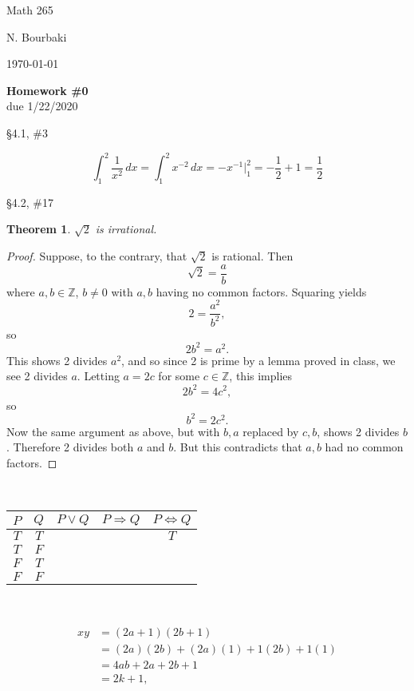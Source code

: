 \documentclass[11pt]{report}
\theoremstyle{plain}
\newtheorem{thm}{Theorem}
\begin{document}
\hfill Math 265

\hfill N. Bourbaki

\hfill \today

\begin{center}
\Large{\textbf{Homework \#0}} \\
due 1/22/2020
\end{center}
\begin{description}
\item{\S 4.1, \#3}

$$\int_1^2 \frac 1 {x^2} \, dx=\int_1^2 x^{-2} \, dx=-x^{-1} \Big |_1^2=-\frac 12+1=\frac 12$$

\item{\S 4.2, \#17}

\begin{thm} $\sqrt 2$ is irrational.
\end{thm}
\begin{proof}
Suppose, to the contrary, that $\sqrt 2$ is rational. Then
$$\sqrt 2=\frac ab$$
where $a,b\in \mathbb Z$, $b\not = 0$ with $a,b$ having no common factors. Squaring yields
$$2=\frac {a^2}{b^2},$$
so
$$2b^2=a^2.$$
This shows 2 divides $a^2$, and so since 2 is prime by a lemma proved in class, we see 2 divides $a$. Letting $a=2c$ for some $c\in \mathbb Z$, this implies
$$2b^2=4c^2,$$ so
$$b^2=2c^2.$$
Now the same argument as above, but with $b,a$ replaced by $c,b$, shows 2 divides $b$. Therefore 2 divides both $a$ and $b$. But this contradicts that $a,b$ had no common factors.
\end{proof}


\item[\S 99.99, \#99]

\ 

\begin{tabular}{c|c|c|c|c}

$P$ & $Q$ & $P\lor Q$ & $P\Rightarrow Q$ & $P \iff Q$ \\
\hline
$T$  & $T$ & & & $T$ \\
$T$  & $F$ & & & \\
$F$  & $T$ & & & \\
$F$  & $F$ & & & \\
\end{tabular}

\ 

\item[An example of aligned equations:]


\begin{align*}
xy&=(2a+1)(2b+1)\\
&=(2a)(2b)+(2a)(1)+1(2b)+1(1)\\
&=4ab+2a+2b+1\\
&=2k+1,
\end{align*}

\end{description}
\end{document}
